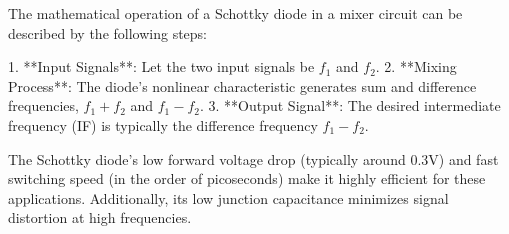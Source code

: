 The mathematical operation of a Schottky diode in a mixer circuit can be described by the following steps:

1. **Input Signals**: Let the two input signals be \( f_1 \) and \( f_2 \).
2. **Mixing Process**: The diode's nonlinear characteristic generates sum and difference frequencies, \( f_1 + f_2 \) and \( f_1 - f_2 \).
3. **Output Signal**: The desired intermediate frequency (IF) is typically the difference frequency \( f_1 - f_2 \).

The Schottky diode's low forward voltage drop (typically around 0.3V) and fast switching speed (in the order of picoseconds) make it highly efficient for these applications. Additionally, its low junction capacitance minimizes signal distortion at high frequencies.

